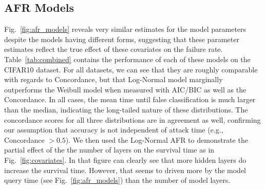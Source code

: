 \subsection{AFR Models}

Fig.~\ref{fig:afr_models} reveals very similar estimates for the model parameters despite the models having different forms, suggesting that these parameter estimates reflect the true effect of these covariates on the failure rate. Table~\ref{tab:combined} contains the performance of each of these models on the CIFAR10 dataset. For all datasets, we can see that they are roughly comparable with regards to Concordance, but that Log-Normal model marginally outperforms the Weibull model when measured with AIC/BIC as well as the Concordance.
In all cases, the mean time until false classification is much larger than the median, indicating the long-tailed nature of these distributions.
The concordance scores for all three distributions are in agreement as well, confirming our assumption that accuracy is not independent of attack time (e.g., Concordance $> 0.5$).
We then used the Log-Normal AFR to demonstrate the partial effect of the the number of layers on the survival time as in Fig.~\ref{fig:covariates}. In that figure can clearly see that more hidden layers do increase the survival time. However, that seems to driven more by the model query time (see Fig.~\ref{fig:afr_models}) than the number of model layers.

